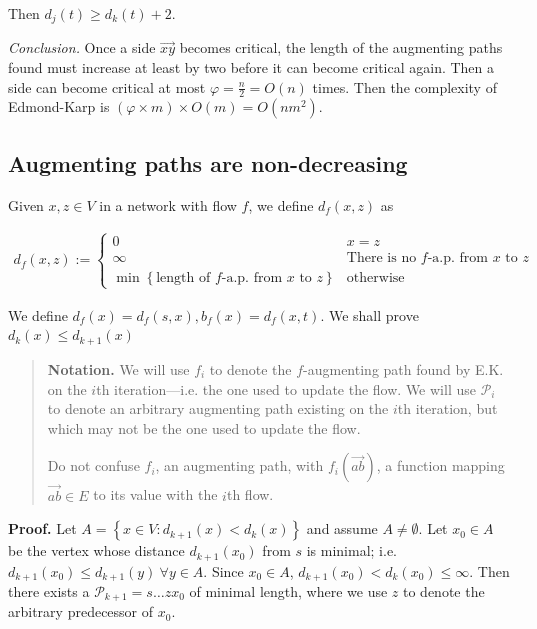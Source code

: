 \documentclass[a4paper, 12pt]{article}
\begin{document}
Then $d_j(t) \geq d_k(t) + 2$.

\textit{Conclusion.} Once a side $\overrightarrow{xy}$ becomes 
critical, the length of the augmenting paths found 
must increase at least by two before it can become 
critical again. Then a side can become critical 
at most $\varphi = \frac{n}{2} = O(n)$ times. Then 
the complexity of Edmond-Karp is $(\varphi \times m) \times O(m) = O(nm^2)$.
    

\pagebreak 

\subsection{Augmenting paths are non-decreasing}

Given $x, z \in V$ in a network with flow $f$, we define $d_{f}(x, z)$ as

\begin{align*}
    d_f(x, z) := \begin{cases}
        0 & x = z \\ 
        \infty &\text{There is no $f$-a.p. from $x$ to $z$} \\ 
        \min \left\{ \text{length of $f$-a.p. from $x$ to $z$} \right\} &\text{otherwise}
    \end{cases}
\end{align*}

We define $d_f(x) = d_f(s, x), b_f(x) = d_f(x, t)$. We shall prove
 $d_k(x) \leq d_{k+1}(x)$  

\begin{quote}
    
    \textbf{Notation.} We will use $f_i$ to denote the $f$-augmenting path
    found by E.K. on the $i$th iteration---i.e. the one used to update the
    flow. We will use $\mathcal{P}_i$ to denote an arbitrary augmenting path
    existing on the $i$th iteration, but which may not be the one used to
    update the flow.

    Do not confuse $f_i$, an augmenting path, with
    $f_i(\overrightarrow{ab})$, a function mapping $\overrightarrow{ab} \in
    E$ to its value with the $i$th flow.
\end{quote}

\textbf{Proof.} Let $A = \left\{ x \in V : d_{k+1}(x) < d_k(x) \right\} $ and
assume $A \neq \emptyset$. Let $x_0 \in A$ be the vertex whose distance
$d_{k+1}(x_0)$ from $s$ is minimal; i.e. $d_{k+1}(x_0) \leq d_{k+1}(y) ~
\forall y \in A$. Since $x_0 \in A$, $d_{k+1}(x_0) < d_k(x_0) \leq \infty$.
Then there exists a $\mathcal{P}_{k+1} = s \ldots zx_0$ of minimal length,
where we use $z$ to denote the arbitrary predecessor of $x_0$.
\end{document}
